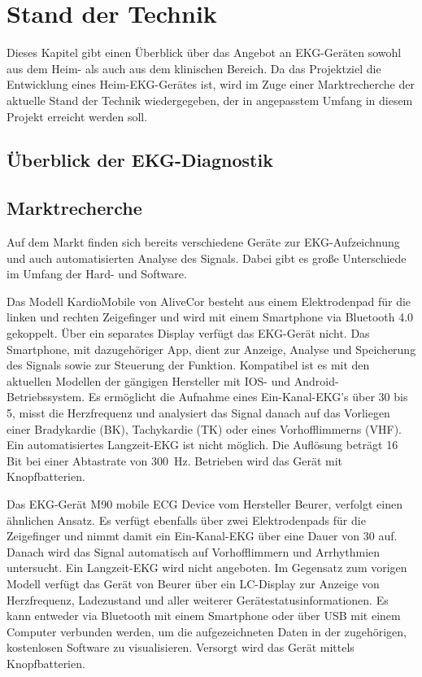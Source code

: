 
\section{Stand der Technik}

Dieses Kapitel gibt einen Überblick über das Angebot an EKG-Geräten sowohl aus dem Heim- als auch aus dem klinischen Bereich. Da das Projektziel die Entwicklung eines Heim-EKG-Gerätes ist, wird im Zuge einer Marktrecherche der aktuelle Stand der Technik wiedergegeben, der in angepasstem Umfang in diesem Projekt erreicht werden soll. 

\subsection{Überblick der EKG-Diagnostik}


\subsection{Marktrecherche}

Auf dem Markt finden sich bereits verschiedene Geräte zur EKG-Aufzeichnung und auch automatisierten Analyse des Signals. Dabei gibt es große Unterschiede im Umfang der Hard- und Software.

Das Modell KardioMobile von AliveCor besteht aus einem Elektrodenpad für die linken und rechten Zeigefinger und wird mit einem Smartphone via Bluetooth 4.0 gekoppelt. Über ein separates Display verfügt das EKG-Gerät nicht. Das Smartphone, mit dazugehöriger App, dient zur Anzeige, Analyse und Speicherung des Signals sowie zur Steuerung der Funktion. Kompatibel ist es mit den aktuellen Modellen der gängigen Hersteller mit IOS- und Android-Betriebssystem. Es ermöglicht die Aufnahme eines Ein-Kanal-EKG's über \SI{30}{\sec} bis \SI{5}{\min}, misst die Herzfrequenz und analysiert das Signal danach auf das Vorliegen einer Bradykardie (BK), Tachykardie (TK) oder eines Vorhofflimmerns (VHF). Ein automatisiertes Langzeit-EKG ist nicht möglich. Die Auflösung beträgt 16 Bit bei einer Abtastrate von \SI{300}{\hertz}. Betrieben wird das Gerät mit Knopfbatterien.

Das EKG-Gerät M90 mobile ECG Device vom Hersteller Beurer, verfolgt einen ähnlichen Ansatz. Es verfügt ebenfalls über zwei Elektrodenpads für die Zeigefinger und nimmt damit ein Ein-Kanal-EKG über eine Dauer von \SI{30}{\sec} auf. Danach wird das Signal automatisch auf Vorhofflimmern und Arrhythmien untersucht. Ein Langzeit-EKG wird nicht angeboten. Im Gegensatz zum vorigen Modell verfügt das Gerät von Beurer über ein LC-Display zur Anzeige von Herzfrequenz, Ladezustand und aller weiterer Gerätestatusinformationen. Es kann entweder via Bluetooth mit einem Smartphone oder über USB mit einem Computer verbunden werden, um die aufgezeichneten Daten in der zugehörigen, kostenlosen Software zu visualisieren. Versorgt wird das Gerät mittels Knopfbatterien.

